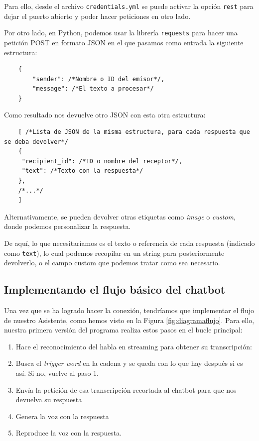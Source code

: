Para ello, desde el archivo \texttt{credentials.yml} se puede activar la opción \texttt{rest} para dejar el puerto abierto y poder hacer peticiones en otro lado.

Por otro lado, en Python, podemos usar la librería \texttt{requests} para hacer una petición POST en formato JSON en el que pasamos como entrada la siguiente estructura:


\begin{lstlisting}
	{
		"sender": /*Nombre o ID del emisor*/,
		"message": /*El texto a procesar*/
	}
\end{lstlisting}

Como resultado nos devuelve otro JSON con esta otra estructura:

\begin{lstlisting}
	[ /*Lista de JSON de la misma estructura, para cada respuesta que se deba devolver*/
	{
	 "recipient_id": /*ID o nombre del receptor*/,
	 "text": /*Texto con la respuesta*/
 	}, 
	/*...*/
	]
\end{lstlisting}

Alternativamente, se pueden devolver otras etiquetas como \textit{image} o \textit{custom}, donde podemos personalizar la respuesta.

De aquí, lo que necesitaríamos es el texto o referencia de cada respuesta (indicado como \texttt{text}), lo cual podemos recopilar en un string para posteriormente devolverlo, o el campo custom que podemos tratar como sea necesario.

\subsection{Implementando el flujo básico del chatbot}
Una vez que se ha logrado hacer la conexión, tendríamos que implementar el flujo de nuestro Asistente, como hemos visto en la Figura \ref{fig:diagramaflujo}. Para ello, nuestra primera versión del programa realiza estos pasos en el bucle principal:
\begin{enumerate}
	\item Hace el reconocimiento del habla en streaming para obtener su transcripción:
	\item Busca el \textit{trigger word} en la cadena y se queda con lo que hay después si es así. Si no, vuelve al paso 1.
	\item Envía la petición de esa transcripción recortada al chatbot para que nos devuelva su respuesta
	\item Genera la voz con la respuesta
	\item Reproduce la voz con la respuesta. 
\end{enumerate}



